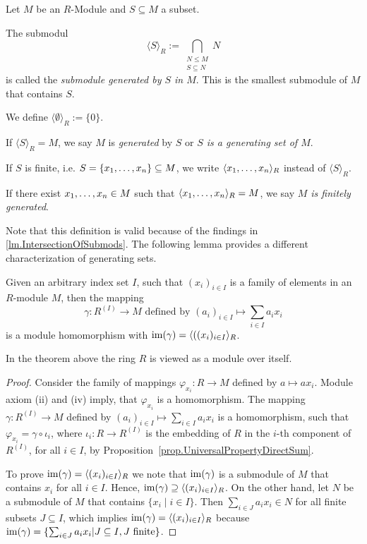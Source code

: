 \begin{defin}
Let $M$ be an $R$-Module and $S\subseteq M$ a subset.
\begin{exlist}
\item The submodul \begin{equation*}
\langle S \rangle_R := \bigcap\limits_{\substack{N\leq M\\S\subseteq N}}N
\end{equation*}  is called the \emph{submodule generated by $S$ in $M$}. This is the smallest submodule of $M$ that contains $S$.
\item We define $\langle\emptyset\rangle_R:=\lbrace 0\rbrace$.
\item If $\langle S \rangle_R=M$, we say $M$ is \emph{generated} by $S$ or \emph{$S$ is a generating set of $M$}.
\item If $S$ is finite, i.e. $S=\lbrace x_{1},\ldots,x_{n}\rbrace\subseteq M$, we write $\langle x_{1},\ldots,x_{n}\rangle_R$ instead of $\langle S \rangle_R$.
\item If there exist $x_{1},\ldots,x_{n}\in M$ such that $\langle x_{1},\ldots,x_{n}\rangle_R=M$, we say \emph{$M$ is finitely generated}.
\end{exlist}
\end{defin}
Note that this definition is valid because of the findings in \cref{lm.IntersectionOfSubmods}. The following lemma provides a different characterization of generating sets.

\begin{thm}\label{lem.Generating Set Homomorphism}
Given an arbitrary index set $I$, such that $(x_i)_{i\in I}$ is a family of elements in an $R$-module $M$, then the mapping
\begin{equation*}
\gamma\colon R^{(I)}\to M \text{ defined by } (a_i)_{i\in I}\mapsto \sum_{i\in I} a_i x_i
\end{equation*}
is a module homomorphism with $\operatorname{im}(\gamma)=\langle ((x_i)_{i\in I}\rangle_R$.
\end{thm}
In the theorem above the ring $R$ is viewed as a module over itself.
\begin{proof}
Consider the family of mappings $\varphi_{x_i}\colon R\to M$ defined by $a\mapsto ax_i$. Module axiom (ii) and (iv) imply, that $\varphi_{x_i}$ is a homomorphism. The mapping $\gamma\colon R^{(I)}\to M$ defined by $(a_i)_{i\in I}\mapsto\sum_{i\in I} a_ix_i$ is a homomorphism, such that $\varphi_{x_i}=\gamma\circ\iota_i$, where $\iota_i\colon R\to R^{(I)}$ is the embedding of $R$ in the $i$-th component of $R^{(I)}$, for all $i\in I$, by Proposition~\ref{prop.UniversalPropertyDirectSum}.

To prove $\operatorname{im}(\gamma)=\langle (x_i)_{i\in I}\rangle_R$ we note that $\operatorname{im}(\gamma)$ is a submodule of $M$ that contains $x_i$ for all $i\in I$. Hence, $\operatorname{im}(\gamma)\supseteq\langle (x_i)_{i\in I}\rangle_R$. On the other hand, let $N$ be a submodule of $M$ that contains $\lbrace x_i\mid i\in I\rbrace$. Then $\sum_{i\in J} a_i x_i\in N$ for all finite subsets $J\subseteq I$, which implies $\operatorname{im}(\gamma)=\langle (x_i)_{i\in I}\rangle_R$ because $\operatorname{im}(\gamma)=\lbrace\sum_{i\in J} a_i x_i| J\subseteq I, J \text{ finite}\rbrace$.
\end{proof}

